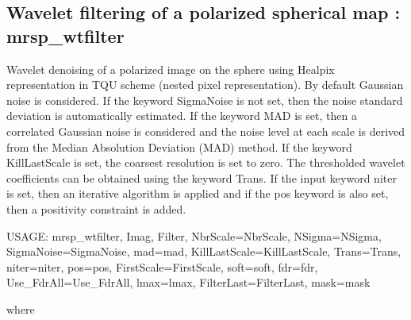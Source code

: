 \subsection{Wavelet filtering of a polarized spherical map : mrsp\_wtfilter}
Wavelet denoising of a polarized image on the sphere using Healpix representation in TQU scheme (nested pixel representation). 
By default Gaussian noise is considered. If the keyword SigmaNoise is not set, then the noise standard deviation is automatically 
estimated. If the keyword MAD is set, then a correlated Gaussian noise is considered and the noise level at each scale is derived 
from the Median Absolution Deviation (MAD) method. If the keyword KillLastScale is set, the coarsest resolution is set to zero. 
The thresholded wavelet coefficients can be obtained using the keyword Trans. If the input keyword niter is set, then an iterative 
algorithm is applied and if the pos keyword is also set, then a positivity constraint is added.
{\bf
\begin{center}
     USAGE:  mrsp\_wtfilter, Imag, Filter, NbrScale=NbrScale, NSigma=NSigma, SigmaNoise=SigmaNoise, mad=mad, 
     KillLastScale=KillLastScale, Trans=Trans, niter=niter, pos=pos, FirstScale=FirstScale, soft=soft, fdr=fdr, 
     Use\_FdrAll=Use\_FdrAll, lmax=lmax, FilterLast=FilterLast, mask=mask 
\end{center}}
where

